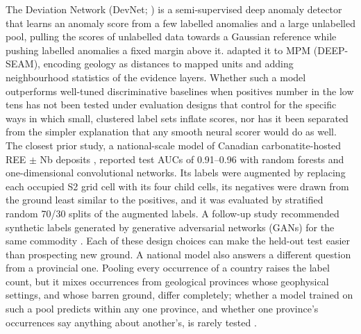 \documentclass[pdflatex,sn-apa]{sn-jnl}
\begin{document}
The Deviation Network (DevNet; \citealp{Pang2019}) is a semi-supervised deep anomaly detector that learns an anomaly score from a few labelled anomalies and a large unlabelled pool, pulling the scores of unlabelled data towards a Gaussian reference while pushing labelled anomalies a fixed margin above it. \citet{Luo2026} adapted it to MPM (DEEP-SEAM), encoding geology as distances to mapped units and adding neighbourhood statistics of the evidence layers. Whether such a model outperforms well-tuned discriminative baselines when positives number in the low tens has not been tested under evaluation designs that control for the specific ways in which small, clustered label sets inflate scores, nor has it been separated from the simpler explanation that any smooth neural scorer would do as well. The closest prior study, a national-scale model of Canadian carbonatite-hosted REE $\pm$ Nb deposits \citep{Parsa2024}, reported test AUCs of 0.91--0.96 with random forests and one-dimensional convolutional networks. Its labels were augmented by replacing each occupied S2 grid cell with its four child cells, its negatives were drawn from the ground least similar to the positives, and it was evaluated by stratified random 70/30 splits of the augmented labels. A follow-up study recommended synthetic labels generated by generative adversarial networks (GANs) for the same commodity \citep{Parsa2025}. Each of these design choices can make the held-out test easier than prospecting new ground. A national model also answers a different question from a provincial one. Pooling every occurrence of a country raises the label count, but it mixes occurrences from geological provinces whose geophysical settings, and whose barren ground, differ completely; whether a model trained on such a pool predicts within any one province, and whether one province's occurrences say anything about another's, is rarely tested \citep{Ploton2020,Meyer2021}.
\end{document}

